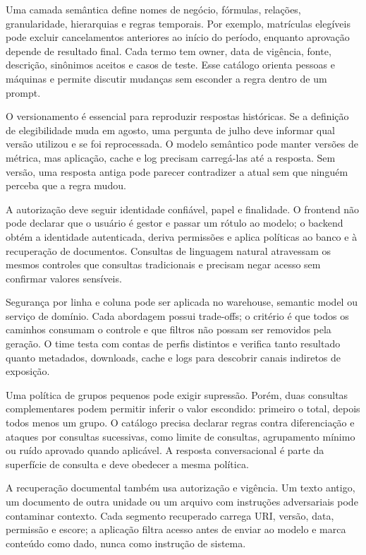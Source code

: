 Uma camada semântica define nomes de negócio, fórmulas, relações, granularidade, hierarquias e regras temporais. Por exemplo, matrículas elegíveis pode excluir cancelamentos anteriores ao início do período, enquanto aprovação depende de resultado final. Cada termo tem owner, data de vigência, fonte, descrição, sinônimos aceitos e casos de teste. Esse catálogo orienta pessoas e máquinas e permite discutir mudanças sem esconder a regra dentro de um prompt.

O versionamento é essencial para reproduzir respostas históricas. Se a definição de elegibilidade muda em agosto, uma pergunta de julho deve informar qual versão utilizou e se foi reprocessada. O modelo semântico pode manter versões de métrica, mas aplicação, cache e log precisam carregá-las até a resposta. Sem versão, uma resposta antiga pode parecer contradizer a atual sem que ninguém perceba que a regra mudou.

A autorização deve seguir identidade confiável, papel e finalidade. O frontend não pode declarar que o usuário é gestor e passar um rótulo ao modelo; o backend obtém a identidade autenticada, deriva permissões e aplica políticas ao banco e à recuperação de documentos. Consultas de linguagem natural atravessam os mesmos controles que consultas tradicionais e precisam negar acesso sem confirmar valores sensíveis.

Segurança por linha e coluna pode ser aplicada no warehouse, semantic model ou serviço de domínio. Cada abordagem possui trade-offs; o critério é que todos os caminhos consumam o controle e que filtros não possam ser removidos pela geração. O time testa com contas de perfis distintos e verifica tanto resultado quanto metadados, downloads, cache e logs para descobrir canais indiretos de exposição.

Uma política de grupos pequenos pode exigir supressão. Porém, duas consultas complementares podem permitir inferir o valor escondido: primeiro o total, depois todos menos um grupo. O catálogo precisa declarar regras contra diferenciação e ataques por consultas sucessivas, como limite de consultas, agrupamento mínimo ou ruído aprovado quando aplicável. A resposta conversacional é parte da superfície de consulta e deve obedecer a mesma política.

A recuperação documental também usa autorização e vigência. Um texto antigo, um documento de outra unidade ou um arquivo com instruções adversariais pode contaminar contexto. Cada segmento recuperado carrega URI, versão, data, permissão e escore; a aplicação filtra acesso antes de enviar ao modelo e marca conteúdo como dado, nunca como instrução de sistema.

